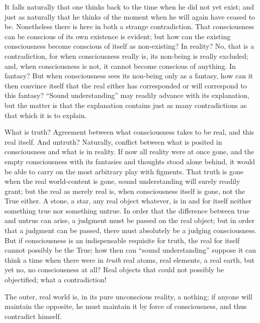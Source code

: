 \documentclass[12pt]{book}
\begin{document}
It falls naturally that one thinks back to the time when he did not yet exist; and
just as naturally that he thinks of the moment when he will again have ceased to
be.
Nonetheless there is here in both a strange contradiction. That consciousness can
be conscious of its own existence is evident; but how can the existing
consciousness become conscious of itself as non-existing? In reality? No, that is
a contradiction, for when consciousness really is, its non-being is really
excluded; and, when consciousness is not, it cannot become conscious of anything.
In fantasy? But when consciousness sees its non-being only as a fantasy, how can
it then convince itself that the real either has corresponded or will correspond
to this fantasy? ``Sound understanding'' may readily advance with its explanation,
but the matter is that the explanation contains just as many contradictions as
that which it is to explain.

What is truth? Agreement between what consciousness takes to be real, and this
real itself. And untruth? Naturally, conflict between what is posited in
consciousness and what is in reality. If now all reality were at once gone, and
the empty consciousness with its fantasies and thoughts stood alone behind, it
would be able to carry on the most arbitrary play with figments. That truth is
gone when the real world-content is gone, sound understanding will surely readily
grant; but the real as merely real is, when consciousness itself is gone, not the
True either. A stone, a star, any real object whatever, is in and for itself
neither something true nor something untrue. In order that the difference between
true and untrue can arise, a judgment must be passed on the real object; but in
order that a judgment can be passed, there must absolutely be a judging
consciousness. But if consciousness is an indispensable requisite for truth, the
real for itself cannot possibly be the True; how then can ``sound understanding''
suppose it can think a time when there were in \emph{truth} real atoms, real
elements, a real earth, but yet
no, no consciousness at all? Real objects that could not possibly be objectified;
what a contradiction!

The outer, real world is, in its pure unconscious reality, a nothing; if anyone
will maintain the opposite, he must maintain it by force of consciousness, and
thus contradict himself.
\end{document}
